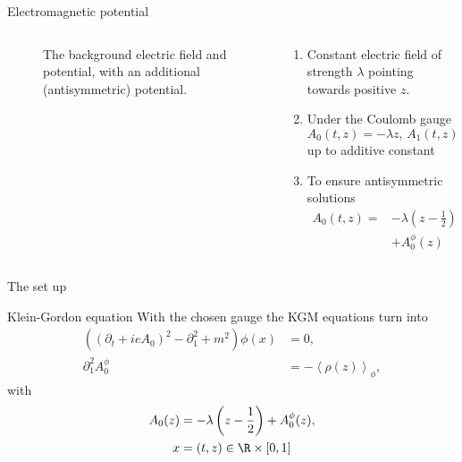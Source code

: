 \begin{frame}{Electromagnetic potential}
	\begin{columns}
	    \begin{column}{0.5\textwidth}
\begin{figure}[ht]
    \centering
    \caption{The background electric field and potential, with an additional (antisymmetric) potential.}
    \label{fig:the-background-electric-field-and-potential,-with-an-additional-(antisymmetric)-potential.}
\end{figure}
	    \end{column}
	    \begin{column}{0.5\textwidth}
		    \begin{enumerate}
		    	\item 
	    Constant electric field of strength $\lambda$ pointing towards positive $z.$
    \item Under the Coulomb gauge $$A_0(t, z) = -\lambda z,\, A_1(t, z) = 0$$ up to additive constant
    \item To ensure antisymmetric solutions 
    \begin{align*}
	    A_0(t, z)=&-\lambda(z-\frac{1}{2}) \\ &+ A_0^{\phi}(z)
    \end{align*}
		    \end{enumerate}
	    \end{column}
	\end{columns}
\end{frame}

\begin{frame}{The set up}
	\begin{themedTitleBlock}{Klein-Gordon equation}
		With the chosen gauge the KGM equations turn into
	\begin{align}
		( (\partial_t + ie A_0) ^2 - \partial_1^2+ m^2) \phi (x) &= 0,\\ 
		\partial_1 ^2 A_0^{\phi} &= - \left<\rho (z) \right>_\phi,
	\end{align}
with  
\begin{align}
	A_0 (z) &= -\lambda\left( z - \frac{1}{2} \right) + A_0^{\phi}(z), \\
	x &= (t, z) \in \R \times [0, 1]
\end{align}
	\end{themedTitleBlock}
\end{frame}

